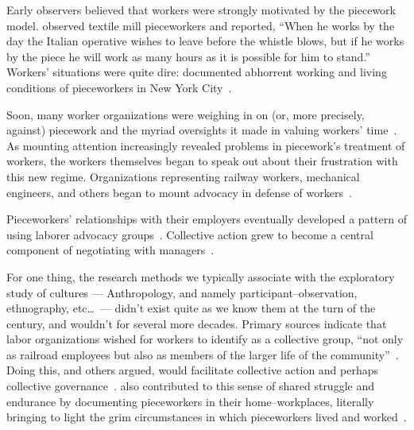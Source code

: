 \documentclass[trackingWork]{subfiles}
\begin{document}
Early observers believed that workers were strongly motivated by the piecework model.
\citeauthor{clark1908cotton} observed textile mill pieceworkers and reported,
``When he works by the day the Italian operative wishes to leave before the whistle blows,
but if he works by the piece he will work as many hours as it is possible for him to stand.''
Workers' situations were quite dire: \citeauthor{riisOtherSideLives}  documented abhorrent working and living conditions of pieceworkers in New York City~\cite{riisOtherSideLives}.


Soon, many worker organizations were weighing in on (or, more precisely, against) piecework and the myriad oversights it made in valuing workers' time~\cite{american1921problem,richards1904anything}.
As mounting attention increasingly revealed problems in piecework's treatment of workers, the workers themselves began to speak out about their frustration with this new regime.
Organizations representing railway workers, mechanical engineers, and others began to mount advocacy in defense of workers~\cite{american1921problem,richards1904anything}.

Pieceworkers' relationships with their employers eventually developed a pattern of using 
laborer advocacy groups~\cite{levi2009union,ahlquist2013interest,
      mccallum2013global,jacoby1983union}.
Collective action grew to become a central component of negotiating with managers~\cite{russell1982collective,olsonlogic}.

For one thing, the research methods we typically associate with the exploratory study of cultures
--- Anthropology, and namely participant--observation, ethnography, etc\dots~---
didn't exist quite as we know them at the turn of the  century, and wouldn't for several more decades.
Primary sources indicate that labor organizations wished for workers to identify as a collective group, 
``not only as railroad employees but also as members of the larger life of the community''~\cite{american1921problem}.
Doing this, 
\citeauthor{ostrom1990governing} and others argued,
would facilitate collective action and perhaps collective governance~\cite{ostrom1990governing,russell1982collective,olsonlogic}.
\citeauthor{riisOtherSideLives} also contributed to this sense of shared struggle and endurance
by documenting pieceworkers in their home--workplaces,
literally bringing to light the grim circumstances in which pieceworkers lived and worked~\cite{riisOtherSideLives}.
\end{document}
